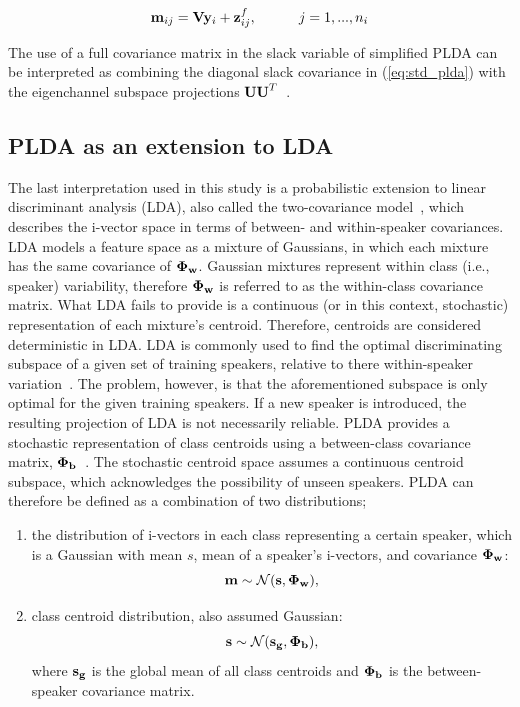 \documentclass[journal]{IEEEtran}
\begin{document}
\begin{equation}
\label{eq:simple_plda}
{\bf m}_{ij} = {\bf V}{\bf y}_i+{\bf z}^f_{ij},  \hspace{30pt} j=1,...,n_i
\end{equation}

The use of a full covariance matrix in the slack variable of simplified PLDA can be interpreted as combining the diagonal slack covariance in (\ref{eq:std_plda}) with the eigenchannel subspace projections ${\bf UU}^T$~\cite{sizov2014unifying}.


\subsection{PLDA as an extension to LDA}
\label{sec:twocov}
The last interpretation used in this study is a probabilistic extension to linear discriminant analysis (LDA), also called the two-covariance model~\cite{sizov2014unifying}, which describes the i-vector space in terms of between- and within-speaker covariances. 
LDA models a feature space as a mixture of Gaussians, in which each mixture has the same covariance of ${\bf \Phi_w}$. 
Gaussian mixtures represent within class (i.e., speaker) variability, therefore ${\bf \Phi_w}$ is referred to as the within-class covariance matrix. 
What LDA fails to provide is a continuous (or in this context, stochastic) representation of each mixture's centroid. 
Therefore, centroids are considered deterministic in LDA. 
LDA is commonly used to find the optimal discriminating subspace of a given set of training speakers, relative to there within-speaker variation~\cite{ioffePLDA2006}. 
The problem, however, is that the aforementioned subspace is only optimal for the given training speakers. 
If a new speaker is introduced, the resulting projection of LDA is not necessarily reliable.
PLDA provides a stochastic representation of class centroids using a between-class covariance matrix, ${\bf \Phi_b}$~\cite{ioffePLDA2006}. 
The stochastic centroid space assumes a continuous centroid subspace, which acknowledges the possibility of unseen speakers. 
PLDA can therefore be defined as a combination of two distributions; 
\begin{enumerate}
	\item the distribution of i-vectors in each class representing a certain speaker, which is a Gaussian with mean $s$, mean of a speaker's i-vectors, and covariance ${\bf \Phi_w}$:
	\begin{equation}
		\label{eq:within_spk_dist}
		{\bf m} \sim \mathcal{N} ({\bf s},{\bf \Phi_w}),
	\end{equation}
\item class centroid distribution, also assumed Gaussian:
	\begin{equation}
		\label{eq:between_spk_dist}
		{\bf s} \sim \mathcal{N} ({\bf s_g},{\bf \Phi_b}),
	\end{equation}
	where ${\bf s_g}$ is the global mean of all class centroids and ${\bf \Phi_b}$ is the between-speaker covariance matrix. 
\end{enumerate}
\end{document}
